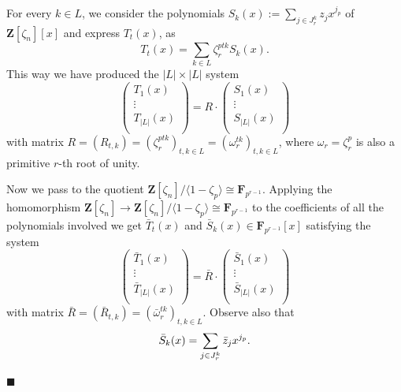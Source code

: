 \documentclass[a4paper,12pt,reqno]{amsart}
\newenvironment{proofofB}{{\bf {Proof of Theorem \ref{Thm:B}.} }}{\hfill $\blacksquare$ \\}
\def\Z{\mathbf{Z}}
\def\F{\mathbf{F}}
\begin{document}
\begin{proofofB}
For every $k \in L$,  we consider the polynomials    
$S_k(x) := \sum_{j \in J_r^k} z_j x^{j_p}$ of $  \Z[\zeta_n][x]$ and express $T_t(x)$,  as  
\begin{equation}\label{eq:T-S}
T_t(x) = \sum_{k\in L}  \zeta_r^{ptk} S_k(x). 
\end{equation}
This way we have produced the $|L| \times |L|$ system 
\begin{equation}\label{eq:system}
   \left( \begin{matrix}
    T_1(x)\\
    \vdots\\
    T_{|L|}(x)\\
\end{matrix}
\right)
= R \cdot  \left( \begin{matrix}
    S_1(x)\\
    \vdots\\
    S_{|L|}(x)\\
\end{matrix}
\right) 
\end{equation}
with matrix $R= (R_{t,k})=(\zeta_r^{ptk})_{t, k \in L}= (\omega_r^{tk})_{t, k \in L}$,  where $\omega_r= \zeta_r^p$ is also a primitive $r$-th root of unity. 

Now we pass to the quotient $\Z[\zeta_n]/\langle 1- \zeta_p \rangle \cong \F_{p^{r-1}}$. 
Applying the homomorphism 
$\Z[\zeta_n] \to \Z[\zeta_n]/\langle 1- \zeta_p \rangle \cong \F_{p^{r-1}}$ to the coefficients of  all the polynomials involved we get $\bar{T}_t(x)$  and $\bar{S}_k(x)  \in \F_{p^{r-1}}[x]$ satisfying the system 
\begin{equation}\label{eq:systemInF_p}
   \left( \begin{matrix}
    \bar{T}_1(x)\\
    \vdots\\
    \bar{T}_{|L|}(x)\\
\end{matrix}
\right)
= \bar{R} \cdot  \left( \begin{matrix}
    \bar{S}_1(x)\\
    \vdots\\
    \bar{S}_{|L|}(x)\\
\end{matrix}
\right) 
\end{equation}
with matrix $\bar{R}= (\bar{R}_{t,k})=(\bar{\omega}_r^{tk})_{t, k \in L}$.
Observe also that 
\begin{equation}\label{eq:bar{s}}
    \bar{S}_k(x)=\sum_{j \in J_r^k} \bar{z}_j x^{j_p}. 
\end{equation}



\end{proofofB}
\end{document}
